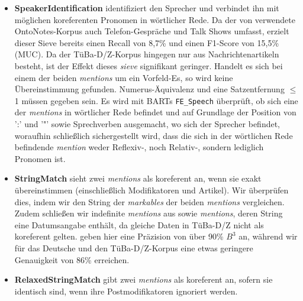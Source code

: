 \documentclass{scrartcl}
\begin{document}
\begin{itemize}

\item \textbf{SpeakerIdentification} identifiziert den Sprecher und verbindet ihn mit möglichen koreferenten Pronomen in wörtlicher Rede. Da der von  verwendete OntoNotes-Korpus auch Telefon-Gespräche und Talk Shows umfasst, erzielt dieser Sieve bereits einen Recall von 8,7\% und einen F1-Score von 15,5\% (MUC). Da der TüBa-D/Z-Korpus hingegen nur aus Nachrichtenartikeln besteht, ist der Effekt dieses \textit{sieve} signifikant geringer. Handelt es sich bei einem der beiden \textit{mentions} um ein Vorfeld-Es, so wird keine Übereinstimmung gefunden. Numerus-Äquivalenz und eine Satzentfernung ${\leq}$ 1 müssen gegeben sein. Es wird mit BARTs \texttt{FE\_Speech} überprüft, ob sich eine der \textit{mentions} in wörtlicher Rede befindet und auf Grundlage der Position von ':' und '"' sowie Sprechverben ausgemacht, wo sich der Sprecher befindet, woraufhin schließlich sichergestellt wird, dass die sich in der wörtlichen Rede befindende \textit{mention} weder Reflexiv-, noch Relativ-, sondern lediglich Pronomen ist.

\item \textbf{StringMatch} sieht zwei \textit{mentions} als koreferent an, wenn sie exakt übereinstimmen (einschließlich Modifikatoren und Artikel). Wir überprüfen dies, indem wir den String der \textit{markables} der beiden \textit{mentions} vergleichen. Zudem schließen wir indefinite \textit{mentions} aus sowie \textit{mentions}, deren String eine Datumsangabe enthält, da gleiche Daten in TüBa-D/Z nicht als koreferent gelten.  geben hier eine Präzision von über 90\% $B^3$ an, während wir für das Deutsche und den TüBa-D/Z-Korpus eine etwas geringere Genauigkeit von 86\% erreichen.

\item \textbf{RelaxedStringMatch} gibt zwei \textit{mentions} als koreferent an, sofern sie identisch sind, wenn ihre Postmodifikatoren ignoriert werden.


\end{itemize}
\end{document}
